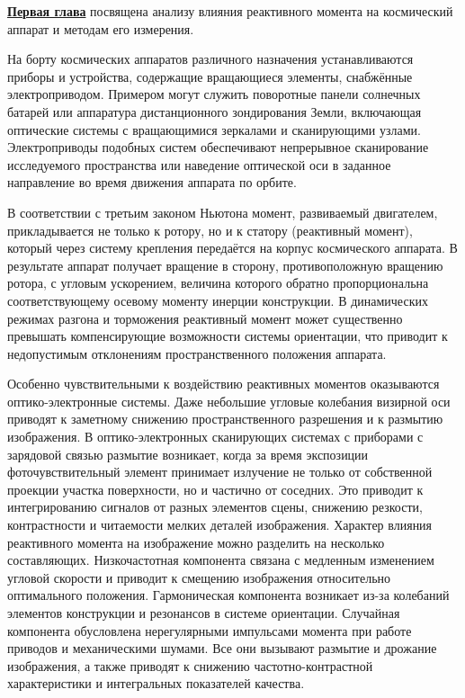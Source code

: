 \underline{\textbf{Первая глава}} посвящена анализу влияния реактивного момента на космический аппарат и методам его измерения.

На борту космических аппаратов различного назначения устанавливаются приборы и устройства, содержащие вращающиеся элементы, снабжённые электроприводом. Примером могут служить поворотные панели солнечных батарей или аппаратура дистанционного зондирования Земли, включающая оптические системы с вращающимися зеркалами и сканирующими узлами. Электроприводы подобных систем обеспечивают непрерывное сканирование исследуемого пространства или наведение оптической оси в заданное направление во время движения аппарата по орбите.

В соответствии с третьим законом Ньютона момент, развиваемый двигателем, прикладывается не только к ротору, но и к статору (реактивный момент), который через систему крепления передаётся на корпус космического аппарата. В результате аппарат получает вращение в сторону, противоположную вращению ротора, с угловым ускорением, величина которого обратно пропорциональна соответствующему осевому моменту инерции конструкции. В динамических режимах разгона и торможения реактивный момент может существенно превышать компенсирующие возможности системы ориентации, что приводит к недопустимым отклонениям пространственного положения аппарата.

Особенно чувствительными к воздействию реактивных моментов оказываются оптико-электронные системы. Даже небольшие угловые колебания визирной оси приводят к заметному снижению пространственного разрешения и к размытию изображения. В оптико-электронных сканирующих системах с приборами с зарядовой связью размытие возникает, когда за время экспозиции фоточувствительный элемент принимает излучение не только от собственной проекции участка поверхности, но и частично от соседних. Это приводит к интегрированию сигналов от разных элементов сцены, снижению резкости, контрастности и читаемости мелких деталей изображения. Характер влияния реактивного момента на изображение можно разделить на несколько составляющих. Низкочастотная компонента связана с медленным изменением угловой скорости и приводит к смещению изображения относительно оптимального положения. Гармоническая компонента возникает из-за колебаний элементов конструкции и резонансов в системе ориентации. Случайная компонента обусловлена нерегулярными импульсами момента при работе приводов и механическими шумами. Все они вызывают размытие и дрожание изображения, а также приводят к снижению частотно-контрастной характеристики и интегральных показателей качества.

